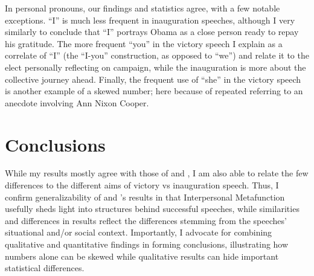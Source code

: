 \documentclass[11pt]{article}
\begin{document}
{	%
	In personal pronouns, our findings and statistics agree, with a few notable exceptions. 
	``I'' is much less frequent in inauguration speeches, although I very similarly to \citeauthor{Ye} conclude that ``I'' portrays Obama as a close person ready to repay his gratitude.
	The more frequent ``you'' in the victory speech I explain as a correlate of ``I'' (the ``I-you'' construction, as opposed to ``we'') and relate it to the elect personally reflecting on campaign, while the inauguration is more about the collective journey ahead.
	Finally, the frequent use of ``she'' in the victory speech is another example of a skewed number; here because of repeated referring to an anecdote involving Ann Nixon Cooper.
}

\section{Conclusions}{
	While my results mostly agree with those of \citeauthor{Ye} and \citeauthor{Nur},
	I am also able to relate the few differences to the different aims of victory vs inauguration speech. 
	Thus, I confirm generalizability of \citeauthor{Ye} and \citeauthor{Nur}'s results in that Interpersonal Metafunction usefully sheds light into structures behind successful speeches, while similarities and differences in results reflect the differences stemming from the speeches' situational and/or social context.
	Importantly, I advocate for combining qualitative and quantitative findings in forming conclusions, illustrating how numbers alone can be skewed while qualitative results can hide important statistical differences.
}





\end{document}
